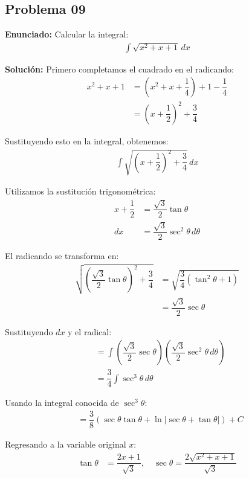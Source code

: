 \subsection*{Problema 09}
\textbf{Enunciado:} Calcular la integral:
\begin{align*}
\int \sqrt{x^2 + x + 1} \, dx
\end{align*}

\textbf{Solución:} Primero completamos el cuadrado en el radicando:
\begin{align*}
x^2 + x + 1 &= \left(x^2 + x + \dfrac{1}{4}\right) + 1 - \dfrac{1}{4} \\
&= \left(x + \dfrac{1}{2}\right)^2 + \dfrac{3}{4}
\end{align*}

Sustituyendo esto en la integral, obtenemos:
\begin{align*}
\int \sqrt{\left(x + \dfrac{1}{2}\right)^2 + \dfrac{3}{4}} \, dx
\end{align*}

Utilizamos la sustitución trigonométrica:
\begin{align*}
x + \dfrac{1}{2} &= \dfrac{\sqrt{3}}{2} \tan\theta \\
dx &= \dfrac{\sqrt{3}}{2} \sec^2\theta \, d\theta
\end{align*}

El radicando se transforma en:
\begin{align*}
\sqrt{\left(\dfrac{\sqrt{3}}{2}\tan\theta\right)^2 + \dfrac{3}{4}} &= \sqrt{\dfrac{3}{4}(\tan^2\theta + 1)} \\
&= \dfrac{\sqrt{3}}{2} \sec\theta
\end{align*}

Sustituyendo $dx$ y el radical:
\begin{align*}
&= \int \left(\dfrac{\sqrt{3}}{2} \sec\theta\right) \left(\dfrac{\sqrt{3}}{2} \sec^2\theta \, d\theta\right) \\
&= \dfrac{3}{4} \int \sec^3\theta \, d\theta
\end{align*}

Usando la integral conocida de $\sec^3\theta$:
\begin{align*}
&= \dfrac{3}{8} \left( \sec\theta \tan\theta + \ln|\sec\theta + \tan\theta| \right) + C
\end{align*}

Regresando a la variable original $x$:
\begin{align*}
\tan\theta &= \dfrac{2x + 1}{\sqrt{3}}, \quad \sec\theta = \dfrac{2\sqrt{x^2 + x + 1}}{\sqrt{3}}
\end{align*}

